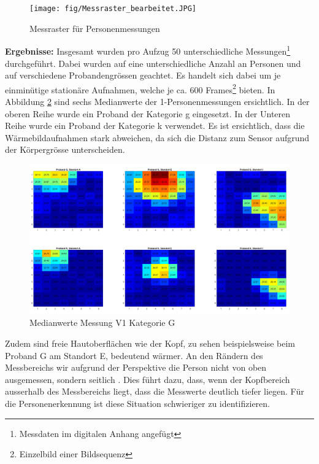 \begin{figure}[H]
	\centering
	\texttt{[image: fig/Messraster\_bearbeitet.JPG]}
	\caption[Messraster für Personenmessungen]{Messraster für Personenmessungen}
	\label{fig:Messraster}
\end{figure}

\textbf{Ergebnisse:} Insgesamt wurden pro Aufzug 50 unterschiedliche Messungen\footnote[20]{Messdaten im digitalen Anhang angefügt} durchgeführt. Dabei wurden auf eine unterschiedliche Anzahl an Personen und auf verschiedene Probandengrössen geachtet. Es handelt sich dabei um je einminütige stationäre Aufnahmen, welche je ca. 600 Frames\footnote[21]{Einzelbild einer Bildsequenz} bieten. In Abbildung \ref{fig:p1gallpositionsmean} sind sechs Medianwerte der 1-Personenmessungen ersichtlich. In der oberen Reihe wurde ein Proband der Kategorie g eingesetzt. In der Unteren Reihe wurde ein Proband der Kategorie k verwendet. Es ist ersichtlich, dass die Wärmebildaufnahmen stark abweichen, da sich die Distanz zum Sensor aufgrund der Körpergrösse unterscheiden.

\begin{figure}[H]
	\centering
	\includegraphics[width=1.0\textwidth]{fig/p1_k_g_aei.jpg}
	\caption[Medianwerte Messung V1 Kategorie G]{Medianwerte Messung V1 Kategorie G}
	\label{fig:p1gallpositionsmean}
\end{figure}

Zudem sind freie Hautoberflächen wie der Kopf, zu sehen beispielsweise beim Proband G am Standort E, bedeutend wärmer. An den Rändern des Messbereichs wir aufgrund der Perspektive die Person nicht von oben ausgemessen, sondern seitlich . Dies führt dazu, dass, wenn der Kopfbereich ausserhalb des Messbereichs liegt, dass die Messwerte deutlich tiefer liegen. Für die Personenerkennung ist diese Situation schwieriger zu identifizieren.

